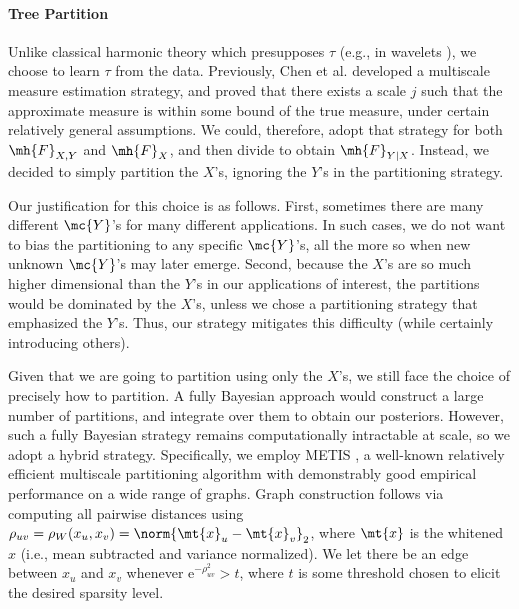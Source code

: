 	\paragraph{Tree Partition} Unlike classical harmonic theory which presupposes $\tau$ (e.g., in wavelets \cite{Daubechies1992}), we choose to learn $\tau$ from the data. Previously, Chen et al. \cite{ChenMaggioni12} developed a multiscale measure estimation strategy, and proved that there exists a scale $j$ such that the approximate measure is within some bound of the true measure, under certain relatively general assumptions.  We could, therefore, adopt that strategy for both $\mh{F}_{X,Y}$ and $\mh{F}_{X}$, and then divide to obtain $\mh{F}_{Y|X}$.  Instead, we decided to simply partition the $X$'s, ignoring the $Y$'s in the partitioning strategy.  
	
	Our justification for this choice is as follows. First, sometimes there are many different $\mc{Y}$'s for many different applications.  In such cases, we do not want to bias the partitioning to any specific $\mc{Y}$'s, all the more so when new unknown $\mc{Y}$'s may later emerge.  Second, because the $X$'s are so much higher dimensional than the $Y$'s in our applications of interest, the partitions would be dominated by the $X$'s, unless we chose a partitioning strategy that emphasized the $Y$'s.  Thus, our strategy mitigates this difficulty (while certainly introducing others). 

	Given that we are going to partition using only the $X$'s, we still face the choice of precisely how to partition.  A fully Bayesian approach would construct a large number of partitions, and integrate over them to obtain our posteriors.  However, such a fully Bayesian strategy remains  computationally intractable at scale, so we adopt a hybrid strategy.  Specifically, we employ METIS \cite{METIS}, a well-known relatively efficient multiscale partitioning algorithm with demonstrably good empirical performance on a wide range of graphs.  Graph construction follows via computing all pairwise distances using $\rho_{uv}=\rho_W(x_u,x_v)=\norm{\mt{x}_u-\mt{x}_v}_2$, where $\mt{x}$ is the whitened $x$ (i.e., mean subtracted and variance normalized). We let there be an edge between $x_u$ and $x_v$ whenever  e$^{-\rho_{uv}^2} > t$, where $t$ is some threshold chosen to elicit the desired sparsity level.
	
